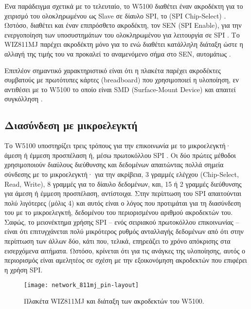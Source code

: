 Ένα παράδειγμα σχετικά με το τελευταίο, το W5100 διαθέτει έναν ακροδέκτη για το
χειρισμό του ολοκληρωμένου ως Slave σε δίαυλο SPI, το 
(\textenglish{SPI Chip-Select}) \parencite[9]{wiz11:w5100}. Ωστόσο, διαθέτει και
έναν επιπρόσθετο ακροδέκτη, τον SEN (\textenglish{SPI Enable}), για την
ενεργοποίηση των υποσυστημάτων του ολοκληρωμένου για λειτουργία σε SPI
\parencite[8]{wiz11:w5100}. Το WIZ811MJ παρέχει ακροδέκτη μόνο για το 
ενώ διαθέτει κατάλληλη διάταξη ώστε η αλλαγή της τιμής του να προκαλεί το
αναμενόμενο σήμα στο SEN, αυτομάτως \parencite[7]{wiz13:811mj}.

Επιπλέον σημαντικό χαρακτηριστικό είναι ότι η πλακέτα παρέχει ακροδέκτες
συμβατούς με πρωτότυπες κάρτες (\textenglish{breadboard}) που χρησιμοποιεί η
υλοποίηση, εν αντιθέσει με το W5100 το οποίο είναι SMD
(\textenglish{Surface-Mount Device}) και απαιτεί συγκόλληση
\parencite[6,12]{wiz13:811mj}.


\subsection{Διασύνδεση με μικροελεγκτή}

Το W5100 υποστηρίζει τρεις τρόπους για την επικοινωνία με το μικροελεγκτή· άμεση
ή έμμεση προσπέλαση ή, μέσω πρωτοκόλλου SPI \parencite[59]{wiz11:w5100}. Οι δύο
πρώτες μέθοδοι χρησιμοποιούν διαύλους διεύθυνσης και δεδομένων απαιτώντας πολλά
σημεία σύνδεσης με το μικροελεγκτή· για την ακρίβεια, 3 γραμμές ελέγχου
(\textenglish{Chip-Select, Read, Write}), 8 γραμμές για το δίαυλο δεδομένων,
και, 15 ή 2 γραμμές διεύθυνσης για άμεση ή έμμεση προσπέλαση, αντίστοιχα. Στην
περίπτωση του SPI απαιτούνται πολύ λιγότερες (μόλις 4) και αυτός είναι ο λόγος
που προτιμάται για τη διασύνδεση του με το μικροελεγκτή, δεδομένου του
περιορισμένου αριθμού ακροδεκτών του.
Σαφώς, το μειονέκτημα χρήσης SPI -- ενός σειριακού
πρωτοκόλλου επικοινωνίας -- είναι ότι επιτυγχάνεται πολύ μικρότερος ρυθμός
ανταλλαγής δεδομένων από ότι στην περίπτωση των άλλων δύο, κάτι που, τελικά,
επηρεάζει το χρόνο απόκρισης στα εισερχόμενα αιτήματα. Ωστόσο, κρίνεται ότι για
τις ανάγκες της υλοποίησης, αυτός ο περιορισμός είναι αμελητέος σε σχέση με την
εξοικονόμηση ακροδεκτών που επιφέρει η χρήση SPI.

\begin{figure}
    \caption{Πλακέτα WIZ811MJ και διάταξη των ακροδεκτών του W5100.
    \label{fig:net:811mj-pins}}
    \begin{center}
    \texttt{[image: network\_811mj\_pin-layout]}
    \end{center}
\end{figure}


